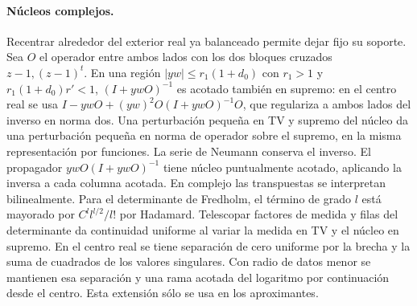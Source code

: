 \paragraph{Núcleos complejos.}
Recentrar alrededor del exterior real ya balanceado permite dejar fijo su soporte.
Sea $O$ el operador entre ambos lados con los dos bloques cruzados $z-1,(z-1)^t$.
En una región $|y w|\le r_1(1+d_0)$ con $r_1>1$ y $r_1(1+d_0)r'<1$,
$(I+yw O)^{-1}$ es acotado también en supremo: en el centro real se usa
$I-ywO+(yw)^2O(I+ywO)^{-1}O$, que regulariza a ambos lados del inverso en norma dos.
Una perturbación pequeña en TV y supremo del núcleo da una perturbación pequeña en
norma de operador sobre el supremo, en la misma representación por funciones.
La serie de Neumann conserva el inverso. El propagador $ywO(I+ywO)^{-1}$
tiene núcleo puntualmente acotado, aplicando la inversa a cada columna acotada.
En complejo las transpuestas se interpretan bilinealmente. Para el determinante de
Fredholm, el término de grado $l$ está mayorado por $C^l l^{l/2}/l!$ por Hadamard.
Telescopar factores de medida y filas del determinante da continuidad uniforme
al variar la medida en TV y el núcleo en supremo. En el centro real se tiene separación
de cero uniforme por la brecha y la suma de cuadrados de los valores singulares.
Con radio de datos menor se mantienen esa separación y una rama acotada del logaritmo
por continuación desde el centro. Esta extensión sólo se usa en los aproximantes.
